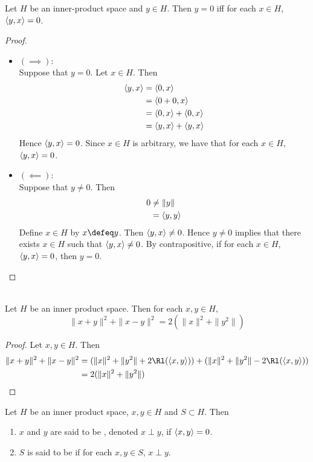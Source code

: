 \documentclass{book}
\begin{document}
\begin{ex}
	Let $H$ be an inner-product space and $y \in H$. Then $y = 0$ iff for each $x \in H$, $\langle y, x\rangle = 0$. 
\end{ex}

\begin{proof}\
	\begin{itemize}
		\item $(\implies)$: \\
		Suppose that $y = 0$. Let $x \in H$. Then  
		\begin{align*}
			\langle y, x \rangle 
			& = \langle 0, x \rangle \\
			& = \langle 0 + 0, x \rangle \\
			& = \langle0, x \rangle + \langle 0, x \rangle  \\
			& = \langle y, x \rangle  + \langle y, x \rangle 
		\end{align*}
		Hence $\langle y, x \rangle  = 0$. Since $x \in H$ is arbitrary, we have that for each $x \in H$, $\langle y, x \rangle =0$.
		\item $(\impliedby)$: \\
		Suppose that $y \neq 0$. Then
		\begin{align*}
			0
			& \neq \|y\| \\
			& = \langle y, y \rangle
		\end{align*}
		Define $x \in H$ by $x \defeq y$. Then $\langle y, x \rangle \neq 0$. Hence $y \neq 0$ implies that there exists $x \in H$ such that $\langle y, x \rangle \neq 0$. By contrapositive, if for each $x \in H$, $\langle y, x \rangle = 0$, then $y = 0$. 
	\end{itemize}
\end{proof}

\begin{ex}  \\
	Let $H$ be an inner product space. Then for each $x,y \in H$, 
	$$\|x+y\|^2 + \|x-y\|^2 = 2(\|x\|^2 + \|y^2\|)$$
\end{ex}

\begin{proof}
	Let $x,y \in H$. Then 
	\begin{align*}
		\|x+y\|^2 + \|x-y\|^2
		& = (\|x\|^2 + \|y^2\| + 2 \Rl(\l x,y\r)) + (\|x\|^2 + \|y^2\| - 2 \Rl(\l x,y\r)) \\
		& = 2(\|x\|^2 + \|y^2\|)
	\end{align*}
\end{proof}

\begin{defn} \ld{}
	Let $H$ be an inner product space, $x, y \in H$ and $S \subset H$. Then
	\begin{enumerate}
	\item $x$ and $y$ are said to be , denoted $x \perp y$, if $\langle x,y\rangle = 0$. 
	\item $S$ is said to be \tbf{orthogonal} if for each $x,y \in S$, $x \perp y$. 
	\end{enumerate}
\end{defn}
\end{document}
